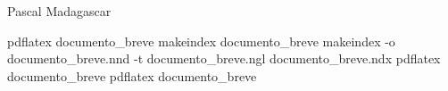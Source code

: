 
\usepackage{index}

Pascal
Madagascar

\printindex %
\printindex[luoghi] %


pdflatex documento_breve
makeindex documento_breve
makeindex -o documento_breve.nnd -t documento_breve.ngl documento_breve.ndx
pdflatex documento_breve
pdflatex documento_breve

